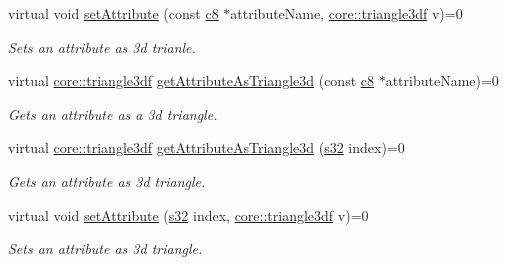 \begin{DoxyCompactItemize}
\mbox{\label{classirr_1_1io_1_1IAttributes_ad86e88d9eb7c7af519fedd04d9328ea6}} 
virtual void \hyperlink{classirr_1_1io_1_1IAttributes_ad86e88d9eb7c7af519fedd04d9328ea6}{set\+Attribute} (const \hyperlink{namespaceirr_a9395eaea339bcb546b319e9c96bf7410}{c8} $\ast$attribute\+Name, \hyperlink{namespaceirr_1_1core_a8983bda2678a7a67d97bf3c7be6c31c7}{core\+::triangle3df} v)=0
\begin{DoxyCompactList}\small\item\em Sets an attribute as 3d trianle. \end{DoxyCompactList}\item 
virtual \hyperlink{namespaceirr_1_1core_a8983bda2678a7a67d97bf3c7be6c31c7}{core\+::triangle3df} \hyperlink{classirr_1_1io_1_1IAttributes_a11b477925de4a257400cc7c920ec5e40}{get\+Attribute\+As\+Triangle3d} (const \hyperlink{namespaceirr_a9395eaea339bcb546b319e9c96bf7410}{c8} $\ast$attribute\+Name)=0
\begin{DoxyCompactList}\small\item\em Gets an attribute as a 3d triangle. \end{DoxyCompactList}\item 
virtual \hyperlink{namespaceirr_1_1core_a8983bda2678a7a67d97bf3c7be6c31c7}{core\+::triangle3df} \hyperlink{classirr_1_1io_1_1IAttributes_a75ff98c5c43f887dcaa2f1c8439d791d}{get\+Attribute\+As\+Triangle3d} (\hyperlink{namespaceirr_ac66849b7a6ed16e30ebede579f9b47c6}{s32} index)=0
\begin{DoxyCompactList}\small\item\em Gets an attribute as 3d triangle. \end{DoxyCompactList}\item 
\mbox{\label{classirr_1_1io_1_1IAttributes_ab5aaaa5b8979eef09b005613264dd8af}} 
virtual void \hyperlink{classirr_1_1io_1_1IAttributes_ab5aaaa5b8979eef09b005613264dd8af}{set\+Attribute} (\hyperlink{namespaceirr_ac66849b7a6ed16e30ebede579f9b47c6}{s32} index, \hyperlink{namespaceirr_1_1core_a8983bda2678a7a67d97bf3c7be6c31c7}{core\+::triangle3df} v)=0
\begin{DoxyCompactList}\small\item\em Sets an attribute as 3d triangle. \end{DoxyCompactList}\item 
\mbox{\label{classirr_1_1io_1_1IAttributes_abf98be37e1be44dfde1f5a34c2e31240}} 

\end{DoxyCompactItemize}
